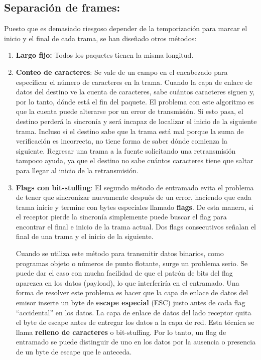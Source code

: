 \subsection{Separación de frames:}
Puesto que es demasiado riesgoso depender de la temporización para marcar el inicio y el final de cada trama, se han diseñado otros métodos:

\begin{enumerate}
  \item \textbf{Largo fijo:} Todos los paquetes tienen la misma longitud.
  \item \textbf{Conteo de caracteres}: Se vale de un campo en el encabezado para especificar el número de caracteres en la trama. Cuando la capa de enlace de datos del destino ve la cuenta de caracteres, sabe cuántos caracteres siguen y, por lo tanto, dónde está el fin del paquete. El problema con este algoritmo es que la cuenta puede alterarse por un error de transmisión. Si esto pasa, el destino perderá la sincronía y será incapaz de localizar el inicio de la siguiente trama. Incluso si el destino sabe que la trama está mal porque la suma de verificación es incorrecta, no tiene
  forma de saber dónde comienza la siguiente. Regresar una trama a la fuente solicitando una retransmisión tampoco ayuda, ya que el destino no sabe cuántos caracteres tiene que saltar para llegar al inicio de la retransmisión.
  \item \textbf{Flags con bit-stuffing}: El segundo método de entramado evita el problema de tener que sincronizar nuevamente después de un error, haciendo que cada trama inicie y termine con bytes especiales llamado \textbf{flags}. De esta manera, si el receptor pierde la sincronía simplemente puede buscar el flag para encontrar el final e inicio de la trama actual. Dos flags consecutivos señalan el final de una trama y el inicio de la siguiente. 
  
  Cuando se utiliza este método para transmitir datos binarios, como programas objeto o números de punto flotante, surge un problema serio. Se puede dar el caso con mucha facilidad de que el patrón de bits del flag aparezca en los datos (payload), lo que interferiría en el entramado. Una forma de resolver este problema es hacer que la capa de enlace de datos del emisor inserte un byte de \textbf{escape especial} (ESC) justo antes de cada flag “accidental” en los datos. La capa de enlace de datos del lado receptor quita el byte de escape antes de entregar los datos a la capa de red. Esta técnica se llama \textbf{relleno de caracteres} o bit-stuffing. Por lo tanto, un flag de entramado se puede distinguir de uno en los datos por la ausencia o presencia de un byte de escape que le anteceda.
\end{enumerate}

